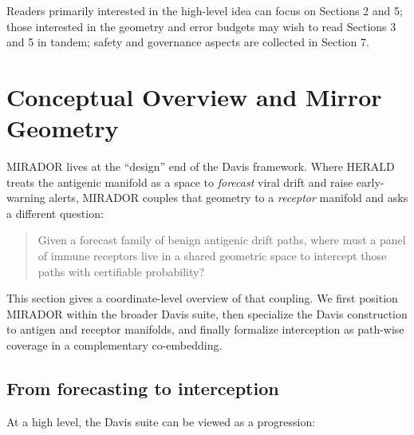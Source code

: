 \documentclass[11pt]{article}
\begin{document}
Readers primarily interested in the high-level idea can focus on Sections 2 and 5;
those interested in the geometry and error budgets may wish to read Sections 3 and 5
in tandem; safety and governance aspects are collected in Section 7.

\section{Conceptual Overview and Mirror Geometry}
\label{sec:conceptual-overview}

MIRADOR lives at the ``design'' end of the Davis framework. Where HERALD treats the antigenic manifold as a space to \emph{forecast} viral drift and raise early-warning alerts, MIRADOR couples that geometry to a \emph{receptor} manifold and asks a different question:

\begin{quote}
  Given a forecast family of benign antigenic drift paths, where must a panel of immune receptors live in a shared geometric space to intercept those paths with certifiable probability?
\end{quote}

This section gives a coordinate-level overview of that coupling. We first position MIRADOR within the broader Davis suite, then specialize the Davis construction to antigen and receptor manifolds, and finally formalize interception as path-wise coverage in a complementary co-embedding.

\subsection{From forecasting to interception}

At a high level, the Davis suite can be viewed as a progression:
\end{document}
